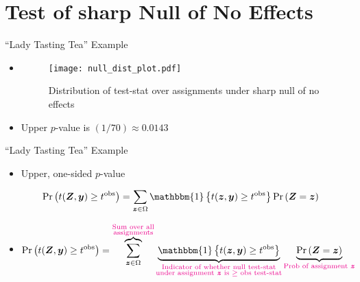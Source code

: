\documentclass[table, xcolor = {dvipsnames}, 9pt]{beamer}
\theoremstyle{plain}
\begin{document}
\section{Test of sharp Null of No Effects}
\begin{frame}{``Lady Tasting Tea'' Example}
\vfill
\begin{itemize}
\item[]
\begin{figure}[H]
\texttt{[image: null\_dist\_plot.pdf]}
\caption{Distribution of test-stat over assignments under sharp null of no effects}
\end{figure} \vfill
\vspace{-2em}
\item Upper $p$-value is $(1/70) \approx 0.0143$
\end{itemize}  
\end{frame}
\begin{frame}{``Lady Tasting Tea'' Example}
\vfill
\begin{itemize} \vfill
\item Upper, one-sided $p$-value \vfill
\begin{itemize} \vfill
\begin{align*}
\Pr\left(t(\bm{Z}, \bm{y}) \geq t^{\text{obs}}\right) & = \sum \limits_{\bm{z} \in \Omega} \mathbbm{1}\left\{t(\bm{z}, \bm{y}) \geq t^{\text{obs}}\right\} \Pr\left(\bm{Z} = \bm{z}\right)
\end{align*} \vfill
\end{itemize} \vfill 
\item[] \pause
\begin{align*}
\Pr\left(t(\bm{Z}, \bm{y}) \geq t^{\text{obs}}\right) & = \overbrace{\sum \limits_{\bm{z} \in \Omega}}^{\substack{\textcolor{magenta}{\text{Sum over all}} \\ \textcolor{magenta}{\text{assignments}}}} \underbrace{\mathbbm{1}\left\{t(\bm{z}, \bm{y}) \geq t^{\text{obs}}\right\}}_{\substack{\textcolor{magenta}{\text{Indicator of whether null test-stat}} \\ \textcolor{magenta}{\text{under assignment } \bm{z} \text{ is } \geq \text{ obs test-stat}}}} \underbrace{\Pr\left(\bm{Z} = \bm{z}\right)}_{\textcolor{magenta}{\text{Prob of assignment } \bm{z}}}
\end{align*} \vfill
\end{itemize} \vfill
\end{frame}
\end{document}
